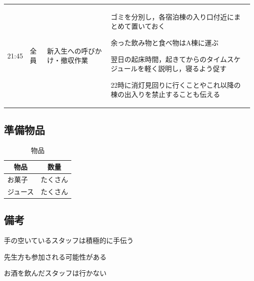\begin{longtable}[c]{|p{}|p{}|p{}|p{}|}
  \begin{tpacol}
    21:45
  \end{tpacol}&
  \begin{tpbcol}
    全員
  \end{tpbcol}&
  \begin{tpccol}
    新入生への呼びかけ・撤収作業
  \end{tpccol}&
  \begin{tpdcol}
    ゴミを分別し，各宿泊棟の入り口付近にまとめて置いておく \par
    余った飲み物と食べ物はA棟に運ぶ \par
    翌日の起床時間，起きてからのタイムスケジュールを軽く説明し，寝るよう促す \par
    22時に消灯見回りに行くことやこれ以降の棟の出入りを禁止することも伝える \par
  \end{tpdcol}\\


\end{longtable}
\normalsize

\subsection{準備物品}
\begin{table}[h]
  \centering
  \caption{物品}
  \begin{tabular}{lr}
    \hline
    \multicolumn{1}{c}{物品} & \multicolumn{1}{c}{数量}  \\
    \hline
    お菓子 & たくさん \\
    ジュース & たくさん  \\
    \hline  
  \end{tabular}
\end{table}

\subsection{備考}
手の空いているスタッフは積極的に手伝う \par
先生方も参加される可能性がある \par
お酒を飲んだスタッフは行かない \par